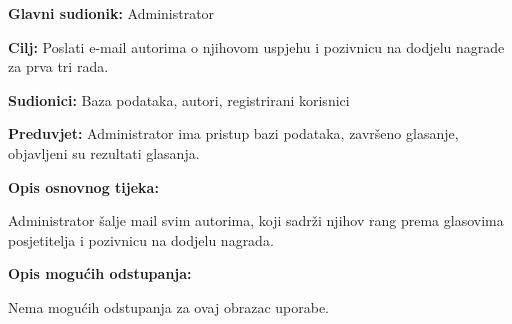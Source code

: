 					\noindent {}
					\begin{packed_item}
						
						\item \textbf{Glavni sudionik: }Administrator
						\item  \textbf{Cilj:} Poslati e-mail autorima o njihovom uspjehu i pozivnicu na dodjelu nagrade za prva tri rada.
						\item  \textbf{Sudionici:} Baza podataka, autori, registrirani korisnici
						\item  \textbf{Preduvjet:} Administrator ima pristup bazi podataka, završeno glasanje, objavljeni su rezultati glasanja.
						\item  \textbf{Opis osnovnog tijeka:}
						
						\item[] \begin{packed_enum}
							
							\item Administrator šalje mail svim autorima, koji sadrži njihov rang prema glasovima posjetitelja i pozivnicu na dodjelu nagrada.
						\end{packed_enum}
						
						\item  \textbf{Opis mogućih odstupanja:}
						
						\item[] \begin{packed_item}
							
							\item Nema mogućih odstupanja za ovaj obrazac uporabe.
							
						\end{packed_item}
					\end{packed_item}
					
